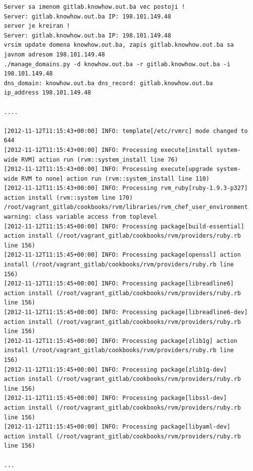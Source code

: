 \documentclass[times, utf8, seminar]{fit}
\begin{document}
\begin{lstlisting}
Server sa imenom gitlab.knowhow.out.ba vec postoji !
Server: gitlab.knowhow.out.ba IP: 198.101.149.48
server je kreiran !
Server: gitlab.knowhow.out.ba IP: 198.101.149.48
vrsim update domena knowhow.out.ba, zapis gitlab.knowhow.out.ba sa javnom adresom 198.101.149.48
./manage_domains.py -d knowhow.out.ba -r gitlab.knowhow.out.ba -i 198.101.149.48
dns_domain: knowhow.out.ba dns_record: gitlab.knowhow.out.ba ip_address 198.101.149.48

....

[2012-11-12T11:15:43+00:00] INFO: template[/etc/rvmrc] mode changed to 644
[2012-11-12T11:15:43+00:00] INFO: Processing execute[install system-wide RVM] action run (rvm::system_install line 76)
[2012-11-12T11:15:43+00:00] INFO: Processing execute[upgrade system-wide RVM to none] action run (rvm::system_install line 110)
[2012-11-12T11:15:43+00:00] INFO: Processing rvm_ruby[ruby-1.9.3-p327] action install (rvm::system line 170)
/root/vagrant_gitlab/cookbooks/rvm/libraries/rvm_chef_user_environment.rb:36: warning: class variable access from toplevel
[2012-11-12T11:15:45+00:00] INFO: Processing package[build-essential] action install (/root/vagrant_gitlab/cookbooks/rvm/providers/ruby.rb line 156)
[2012-11-12T11:15:45+00:00] INFO: Processing package[openssl] action install (/root/vagrant_gitlab/cookbooks/rvm/providers/ruby.rb line 156)
[2012-11-12T11:15:45+00:00] INFO: Processing package[libreadline6] action install (/root/vagrant_gitlab/cookbooks/rvm/providers/ruby.rb line 156)
[2012-11-12T11:15:45+00:00] INFO: Processing package[libreadline6-dev] action install (/root/vagrant_gitlab/cookbooks/rvm/providers/ruby.rb line 156)
[2012-11-12T11:15:45+00:00] INFO: Processing package[zlib1g] action install (/root/vagrant_gitlab/cookbooks/rvm/providers/ruby.rb line 156)
[2012-11-12T11:15:45+00:00] INFO: Processing package[zlib1g-dev] action install (/root/vagrant_gitlab/cookbooks/rvm/providers/ruby.rb line 156)
[2012-11-12T11:15:45+00:00] INFO: Processing package[libssl-dev] action install (/root/vagrant_gitlab/cookbooks/rvm/providers/ruby.rb line 156)
[2012-11-12T11:15:45+00:00] INFO: Processing package[libyaml-dev] action install (/root/vagrant_gitlab/cookbooks/rvm/providers/ruby.rb line 156)

...


\end{lstlisting}
\end{document}
